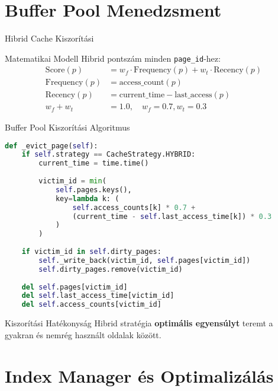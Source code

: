 \documentclass[aspectratio=169]{beamer}
\begin{document}
\section{Buffer Pool Menedzsment}

\begin{frame}[fragile]{Hibrid Cache Kiszorítási}
\begin{block}{Matematikai Modell}
Hibrid pontszám minden \texttt{page\_id}-hez:
\begin{align}
\text{Score}(p) &= w_f \cdot \text{Frequency}(p) + w_t \cdot \text{Recency}(p) \\
\text{Frequency}(p) &= \text{access\_count}(p) \\
\text{Recency}(p) &= \text{current\_time} - \text{last\_access}(p) \\
w_f + w_t &= 1.0, \quad w_f = 0.7, w_t = 0.3
\end{align}
\end{block}
\end{frame}

\begin{frame}[fragile]{Buffer Pool Kiszorítási Algoritmus}
\begin{lstlisting}[language=Python]
def _evict_page(self):
    if self.strategy == CacheStrategy.HYBRID:
        current_time = time.time()
        
        victim_id = min(
            self.pages.keys(),
            key=lambda k: (
                self.access_counts[k] * 0.7 +                    
                (current_time - self.last_access_time[k]) * 0.3  
            )
        )
    
    if victim_id in self.dirty_pages:
        self._write_back(victim_id, self.pages[victim_id])
        self.dirty_pages.remove(victim_id)
    
    del self.pages[victim_id]
    del self.last_access_time[victim_id]
    del self.access_counts[victim_id]
\end{lstlisting}

\begin{block}{Kiszorítási Hatékonyság}
Hibrid stratégia \textbf{optimális egyensúlyt} teremt a gyakran és nemrég használt oldalak között.
\end{block}
\end{frame}

\section{Index Manager és Optimalizálás}
\end{document}
